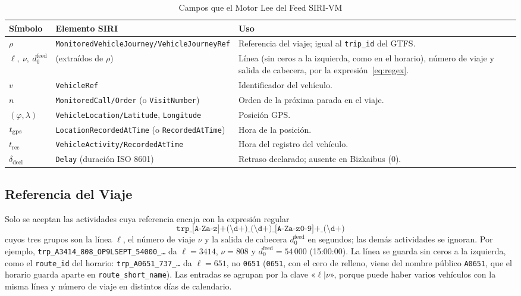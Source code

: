 \begin{table}[ht]
\centering
\caption{Campos que el Motor Lee del Feed SIRI-VM}\label{tab:feed}
\begin{tabularx}{\textwidth}{@{}llX@{}}
\toprule
Símbolo & Elemento SIRI & Uso \\
\midrule
$\rho$ & \texttt{MonitoredVehicleJourney/VehicleJourneyRef} & Referencia del viaje; igual al \texttt{trip\_id} del GTFS. \\
$\ell,\ \nu,\ d_0^{\mathrm{feed}}$ & (extraídos de $\rho$) & Línea (sin ceros a la izquierda, como en el horario), número de viaje y salida de cabecera, por la expresión~\eqref{eq:regex}. \\
$v$ & \texttt{VehicleRef} & Identificador del vehículo. \\
$n$ & \texttt{MonitoredCall/Order} (o \texttt{VisitNumber}) & Orden de la próxima parada en el viaje. \\
$(\varphi,\lambda)$ & \texttt{VehicleLocation/Latitude}, \texttt{Longitude} & Posición GPS. \\
$t_{\mathrm{gps}}$ & \texttt{LocationRecordedAtTime} (o \texttt{RecordedAtTime}) & Hora de la posición. \\
$t_{\mathrm{rec}}$ & \texttt{VehicleActivity/RecordedAtTime} & Hora del registro del vehículo. \\
$\delta_{\mathrm{decl}}$ & \texttt{Delay} (duración ISO 8601) & Retraso declarado; ausente en Bizkaibus ($0$). \\
\bottomrule
\end{tabularx}
\end{table}

\subsection{Referencia del Viaje} Solo se aceptan las actividades cuya referencia encaja con la expresión regular
\begin{equation}
\label{eq:regex}
\texttt{\^{}trp\_[A-Za-z]+(\textbackslash d+)\_(\textbackslash d+)\_[A-Za-z0-9]+\_(\textbackslash d+)}
\end{equation}
cuyos tres grupos son la línea $\ell$, el número de viaje $\nu$ y la salida de cabecera $d_0^{\mathrm{feed}}$ en
segundos; las demás actividades se ignoran. Por ejemplo, \texttt{trp\_A3414\_808\_OP9LSEPT\_54000\_\ldots} da
$\ell=3414$, $\nu=808$ y $d_0^{\mathrm{feed}}=54\,000$ (15:00:00). La línea se guarda sin ceros a la izquierda, como el
\texttt{route\_id} del horario: \texttt{trp\_A0651\_737\_\ldots} da $\ell=651$, no \texttt{0651} (\texttt{0651}, con el
cero de relleno, viene del nombre público \texttt{A0651}, que el horario guarda aparte en \texttt{route\_short\_name}).
Las entradas se agrupan por la clave «$\ell|\nu$», porque puede haber varios vehículos con la misma línea y número de
viaje en distintos días de calendario.

